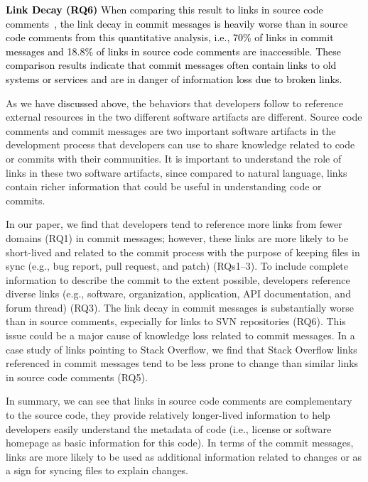 \documentclass[smallextended]{svjour3}       %
\newcommand{\fix}[1]{\textcolor{black}{#1}}
\begin{document}
\fix{\textbf{Link Decay (RQ6)}
When comparing this result to links in source code comments~\citep{hata20199},
the link decay in commit messages is heavily worse than in source code comments from this quantitative analysis, i.e., 70\% of links in commit messages and 18.8\% of links in source code comments are inaccessible. These comparison results indicate that commit messages often contain links to old systems or services and are in danger of information loss due to broken links.}

As we have \fix{discussed above}, the behaviors that developers follow to reference external resources in the two different software artifacts are different. Source code comments and commit messages are two important software artifacts in the development process that developers can use to share knowledge related to code or commits with their communities. It is important to understand the role of links in these two software artifacts, since compared to natural language, links contain richer information that could be useful in understanding code or commits.

In our paper, we find that developers tend to reference more links from fewer domains (RQ1) in commit messages; however, these links are more likely to be short-lived and related to the commit process with the purpose of keeping files in sync (e.g., bug report, pull request, and patch) (RQs1--3). To include complete information to describe the commit to the extent possible, developers reference diverse links (e.g., software, organization, application, API documentation, and forum thread) (RQ3). The link decay in commit messages is substantially worse than in source comments, especially for links to SVN repositories (RQ6). This issue could be a major cause of knowledge loss related to commit messages. In a case study of links pointing to Stack Overflow, we find that Stack Overflow links referenced in commit messages tend to be less prone to change than similar links in source code comments (RQ5).

In summary, we can see that links in source code comments are complementary to the source code, they provide relatively longer-lived information to help developers easily understand the metadata of code (i.e., license or software homepage as basic information for this code). In terms of the commit messages, links are more likely to be used as additional information related to changes or as a sign for syncing files to explain changes. 
\end{document}
